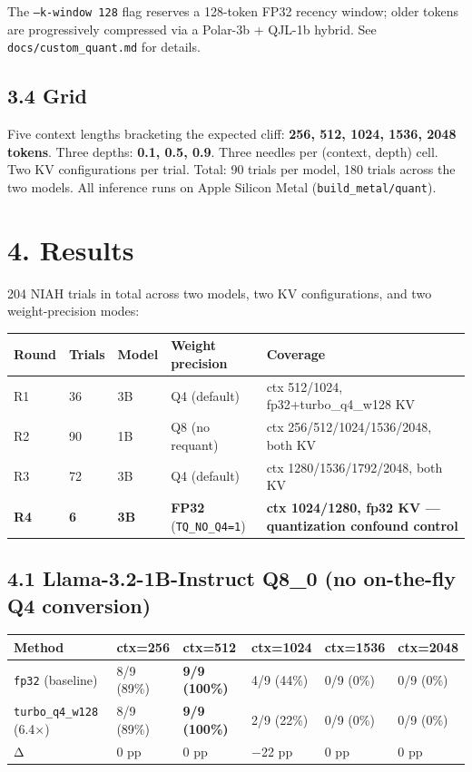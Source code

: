 \documentclass[11pt]{article}
\begin{document}
The \texttt{--k-window 128} flag reserves a 128-token FP32 recency window; older tokens are progressively compressed via a Polar-3b + QJL-1b hybrid. See \texttt{docs/custom\_quant.md} for details.


\subsection*{3.4 Grid}


Five context lengths bracketing the expected cliff: \textbf{256, 512, 1024, 1536, 2048 tokens}. Three depths: \textbf{0.1, 0.5, 0.9}. Three needles per (context, depth) cell. Two KV configurations per trial. Total: 90 trials per model, 180 trials across the two models. All inference runs on Apple Silicon Metal (\texttt{build\_metal/quant}).


\section*{4. Results}


204 NIAH trials in total across two models, two KV configurations, and two weight-precision modes:


\begin{center}
\begin{tabular}{lllll}
\toprule
Round & Trials & Model & Weight precision & Coverage \\
\midrule
R1 & 36 & 3B & Q4 (default) & ctx 512/1024, fp32+turbo\_q4\_w128 KV \\
R2 & 90 & 1B & Q8 (no requant) & ctx 256/512/1024/1536/2048, both KV \\
R3 & 72 & 3B & Q4 (default) & ctx 1280/1536/1792/2048, both KV \\
\textbf{R4} & \textbf{6} & \textbf{3B} & \textbf{FP32} (\texttt{TQ\_NO\_Q4=1}) & \textbf{ctx 1024/1280, fp32 KV — quantization confound control} \\
\bottomrule
\end{tabular}
\end{center}


\subsection*{4.1 Llama-3.2-1B-Instruct Q8\_0 (no on-the-fly Q4 conversion)}


\begin{center}
\begin{tabular}{llllll}
\toprule
Method & ctx=256 & ctx=512 & ctx=1024 & ctx=1536 & ctx=2048 \\
\midrule
\texttt{fp32} (baseline) & 8/9 (89\%) & \textbf{9/9 (100\%)} & 4/9 (44\%) & 0/9 (0\%) & 0/9 (0\%) \\
\texttt{turbo\_q4\_w128} (6.4×) & 8/9 (89\%) & \textbf{9/9 (100\%)} & 2/9 (22\%) & 0/9 (0\%) & 0/9 (0\%) \\
Δ & 0 pp & 0 pp & −22 pp & 0 pp & 0 pp \\
\bottomrule
\end{tabular}
\end{center}
\end{document}
